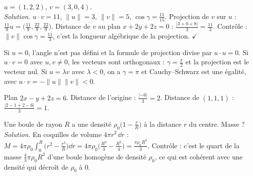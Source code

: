 \begin{exemple}
$u=(1,2,2)$, $v=(3,0,4)$.\\
\emph{Solution.} $u\cdot v=11$, $\|u\|=3$, $\|v\|=5$, $\cos\gamma=\frac{11}{15}$. Projection de $v$ sur $u$ : $\frac{11}9u=\big(\frac{11}9,\frac{22}9,\frac{22}9\big)$. Distance de $v$ au plan $x+2y+2z=0$ : $\frac{|3+0+8|}3=\frac{11}3$. Contrôle : $\|v\|\cos\gamma=\frac{11}3$, c'est la longueur algébrique de la projection. $\checkmark$
\end{exemple}
\begin{cas}
Si $u=0$, l'angle n'est pas défini et la formule de projection divise par $u\cdot u=0$. Si $u\cdot v=0$ avec $u,v\ne0$, les vecteurs sont orthogonaux : $\gamma=\frac\pi2$ et la projection est le vecteur nul. Si $u=\lambda v$ avec $\lambda<0$, on a $\gamma=\pi$ et Cauchy--Schwarz est une égalité, avec $u\cdot v=-\|u\|\|v\|<0$.
\end{cas}
\begin{exemple}
Plan $2x-y+2z=6$. Distance de l'origine : $\frac{|-6|}3=2$. Distance de $(1,1,1)$ : $\frac{|2-1+2-6|}3=1$.
\end{exemple}
\begin{exemple}
Une boule de rayon $R$ a une densité $\rho_0\big(1-\frac rR\big)$ à la distance $r$ du centre. Masse ?\\
\emph{Solution.} En coquilles de volume $4\pi r^2\,\dd r$ : $M=4\pi\rho_0\int_0^R\big(r^2-\frac{r^3}R\big)\dd r=4\pi\rho_0\big(\frac{R^3}3-\frac{R^3}4\big)=\frac{\pi\rho_0R^3}3$. Contrôle : c'est le quart de la masse $\frac43\pi\rho_0R^3$ d'une boule homogène de densité $\rho_0$, ce qui est cohérent avec une densité qui décroît de $\rho_0$ à $0$.
\end{exemple}

